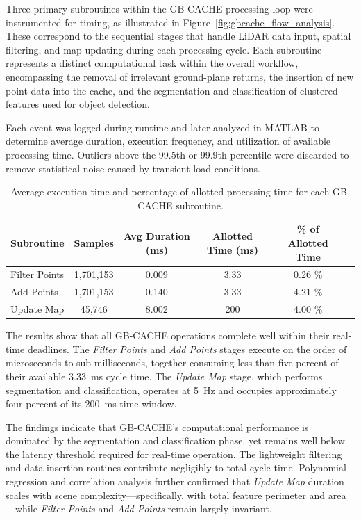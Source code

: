\documentclass{erauthesis}
\begin{document}
Three primary subroutines within the GB-CACHE processing loop were instrumented for timing, as illustrated in Figure~\ref{fig:gbcache_flow_analysis}. 
These correspond to the sequential stages that handle LiDAR data input, spatial filtering, and map updating during each processing cycle. 
Each subroutine represents a distinct computational task within the overall workflow, encompassing the removal of irrelevant ground-plane returns, the insertion of new point data into the cache, and the segmentation and classification of clustered features used for object detection.

Each event was logged during runtime and later analyzed in MATLAB to determine average duration, execution frequency, and utilization of available processing time. 
Outliers above the 99.5th or 99.9th percentile were discarded to remove statistical noise caused by transient load conditions.

\begin{table}[htbp]
\centering
\begin{tabular}{lccccc}
\hline
Subroutine & Samples & Avg Duration (ms) & Allotted Time (ms) & \% of Allotted Time\\
\hline
Filter Points & 1,701,153 & 0.009 &  3.33 & 0.26 \% \\
Add Points & 1,701,153 & 0.140 &  3.33 & 4.21 \% \\
Update Map & 45,746 & 8.002 & 200 & 4.00 \% \\
\hline
\end{tabular}
\caption{Average execution time and percentage of allotted processing time for each GB-CACHE subroutine.}
\label{tbl:gbcache_subroutine_results}
\end{table}

The results show that all GB-CACHE operations complete well within their real-time deadlines. 
The \textit{Filter Points} and \textit{Add Points} stages execute on the order of microseconds to sub-milliseconds, together consuming less than five percent of their available 3.33~ms cycle time. 
The \textit{Update Map} stage, which performs segmentation and classification, operates at 5~Hz and occupies approximately four percent of its 200~ms time window.

The findings indicate that GB-CACHE’s computational performance is dominated by the segmentation and classification phase, yet remains well below the latency threshold required for real-time operation. 
The lightweight filtering and data-insertion routines contribute negligibly to total cycle time. 
Polynomial regression and correlation analysis further confirmed that \textit{Update Map} duration scales with scene complexity---specifically, with total feature perimeter and area---while \textit{Filter Points} and \textit{Add Points} remain largely invariant.
\end{document}
